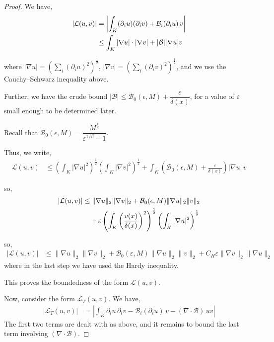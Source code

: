 \documentclass{article}
\theoremstyle{plain}
\theoremstyle{definition}
\theoremstyle{plain}
\newcommand{\eps}{\epsilon}
\begin{document}
\begin{proof} We have,
    \begin{align}
|\mathcal{L}(u,v)| &= \left| \int_K (\partial_i u)(\partial_i v) + \mathcal{B}_i(\partial_i u)\, v \right| \notag \\
&\leq \int_K |\nabla u| \cdot |\nabla v| + |\mathcal{B}||\nabla u| v
\end{align}

where $|\nabla u| = \left(\sum_i (\partial_i u)^2\right)^{\frac{1}{2}}$, $|\nabla v| = \left(\sum_i (\partial_i v)^2\right)^{\frac{1}{2}}$, and we use the Cauchy--Schwarz inequality above.

Further, we have the crude bound $|\mathcal{B}| \leq \mathcal{B}_0(\eps,M) + \dfrac{\varepsilon}{\delta(x)}$,
for a value of $\varepsilon$ small enough to be determined later.

Recall that $\mathcal{B}_0(\eps,M) = \dfrac{M^{\frac{1}{\beta}}}{\varepsilon^{1/\beta}-1}$.


Thus, we write,
\begin{align}
\mathcal{L}(u,v) &\leq \left(\int_K |\nabla u|^2\right)^{\frac{1}{2}}
\left(\int_K |\nabla v|^2\right)^{\frac{1}{2}}
+ \int_K \left(\mathcal{B}_0(\eps,M) + \frac{\varepsilon}{\delta(x)}\right)|\nabla u|\, v
\end{align}

so,
\begin{align}
|\mathcal{L}(u,v)| &\leq \|\nabla u\|_2 \|\nabla v\|_2
+ \mathcal{B}_0(\eps,M) \|\nabla u\|_2 \|v\|_2 \notag \\
&\quad + \varepsilon \left(\int_K \left(\frac{v(x)}{\delta(x)}\right)^2\right)^{\frac{1}{2}}
\left(\int_K |\nabla u|^2 \right)^{\frac{1}{2}}
\end{align}

so,
\begin{align}
|\mathcal{L}(u,v)| &\leq \|\nabla u\|_2 \|\nabla v\|_2
+ \mathcal{B}_0(\varepsilon, M)\|\nabla u\|_2 \|v\|_2
+ C_{H}\varepsilon \|\nabla v\|_2 \|\nabla u\|_2
\end{align}
where in the last step we have used the Hardy inequality.

This proves the boundedness of the form $\mathcal{L}(u,v)$.

Now, consider the form $\mathcal{L}_T(u,v)$. We have,
\begin{align}\label{eq23}
|\mathcal{L}_T(u,v)| &= \left| \int_K \partial_i u\, \partial_i v
- \mathcal{B}_i(\partial_i u)\,v - (\nabla \cdot \mathcal{B})\, uv \right|
\end{align}
The first two terms are dealt with as above, and it remains to
bound the last term involving $(\nabla \cdot \mathcal{B})$.


\end{proof}
\end{document}
